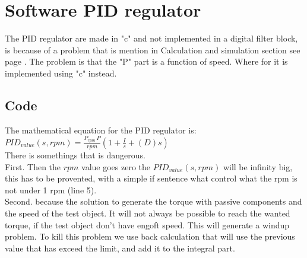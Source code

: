 \newpage
\section{Software PID regulator}

The PID regulator are made in "c" and not implemented in a digital filter block, is because of a problem that is mention in Calculation and simulation section see page \pageref{sec:Calculation_and_Simulation}. The problem is that the "P" part is a function of speed. Where for it is implemented using "c" instead.\\

\subsection{Code}

The mathematical equation for the PID regulator is:\\   

$ PID_{value} \left( s,rpm \right) = {\frac {P_{rpm}\,P}{rpm} \left( 1+{\frac {I}{s}}+ \left( D \right) s \right) } $\\

There is somethings that is dangerous. \\
First. Then the $ rpm $ value goes zero the $  PID_{value} \left( s,rpm \right) $ will be infinity big, this has to be provented, with a simple if sentence what control what the rpm is not under 1 rpm (line 5). \\
Second. because the solution to generate the torque with passive components and the speed of the test object. It will not always be possible to reach the wanted torque, if the test object don't have engoft speed. This will generate a windup problem. To kill this problem we use back calculation that will use the previous value that has exceed the limit, and add it to the integral part. 


